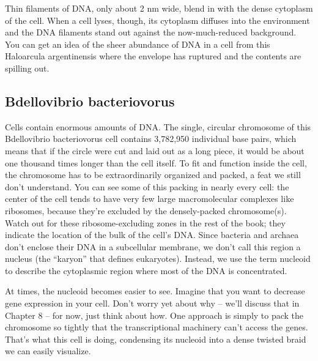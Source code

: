 \documentclass[]{tufte-book}
\begin{document}
Thin filaments of DNA, only about 2 nm wide, blend in with the dense
cytoplasm of the cell. When a cell lyses, though, its cytoplasm diffuses
into the environment and the DNA filaments stand out against the
now-much-reduced background. You can get an idea of the sheer abundance
of DNA in a cell from this Haloarcula argentinensis where the envelope
has ruptured and the contents are spilling out.

\subsection{Bdellovibrio
bacteriovorus}\label{bdellovibrio-bacteriovorus}

Cells contain enormous amounts of DNA. The single, circular chromosome
of this Bdellovibrio bacteriovorus cell contains 3,782,950 individual
base pairs, which means that if the circle were cut and laid out as a
long piece, it would be about one thousand times longer than the cell
itself. To fit and function inside the cell, the chromosome has to be
extraordinarily organized and packed, a feat we still don't understand.
You can see some of this packing in nearly every cell: the center of the
cell tends to have very few large macromolecular complexes like
ribosomes, because they're excluded by the densely-packed chromosome(s).
Watch out for these ribosome-excluding zones in the rest of the book;
they indicate the location of the bulk of the cell's DNA. Since bacteria
and archaea don't enclose their DNA in a subcellular membrane, we don't
call this region a nucleus (the ``karyon'' that defines eukaryotes).
Instead, we use the term nucleoid to describe the cytoplasmic region
where most of the DNA is concentrated.

At times, the nucleoid becomes easier to see. Imagine that you want to
decrease gene expression in your cell. Don't worry yet about why --
we'll discuss that in Chapter 8 -- for now, just think about how. One
approach is simply to pack the chromosome so tightly that the
transcriptional machinery can't access the genes. That's what this cell
is doing, condensing its nucleoid into a dense twisted braid we can
easily visualize.


\end{document}
